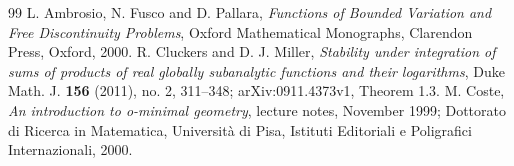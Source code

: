 \begin{thebibliography}{99}
 L. Ambrosio, N. Fusco and D. Pallara,
\emph{Functions of Bounded Variation and Free Discontinuity Problems},
Oxford Mathematical Monographs, Clarendon Press, Oxford, 2000.
 R. Cluckers and D. J. Miller,
\emph{Stability under integration of sums of products of real globally
subanalytic functions and their logarithms}, Duke Math. J.
\textbf{156} (2011), no. 2, 311--348; arXiv:0911.4373v1,
Theorem 1.3.
 M. Coste, \emph{An introduction to o-minimal geometry},
lecture notes, November 1999; Dottorato di Ricerca in Matematica,
Universit\`a di Pisa, Istituti Editoriali e Poligrafici Internazionali, 2000.
\end{thebibliography}
